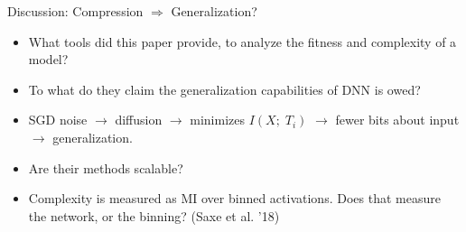 \begin{frame}{Discussion: Compression $\Rightarrow$ Generalization?}

\begin{itemize}
    \item What tools did this paper provide, to analyze the fitness and complexity of a model?
    \item To what do they claim the generalization capabilities of DNN is owed?
    \item SGD noise $\rightarrow$ diffusion $\rightarrow$ minimizes $I(X;\;T_i)$ $\rightarrow$ fewer bits about input $\rightarrow$ generalization.
    \item Are their methods scalable?
    \item Complexity is measured as MI over binned activations. Does that measure the network, or the binning? (Saxe et al. '18)
\end{itemize}
\end{frame}